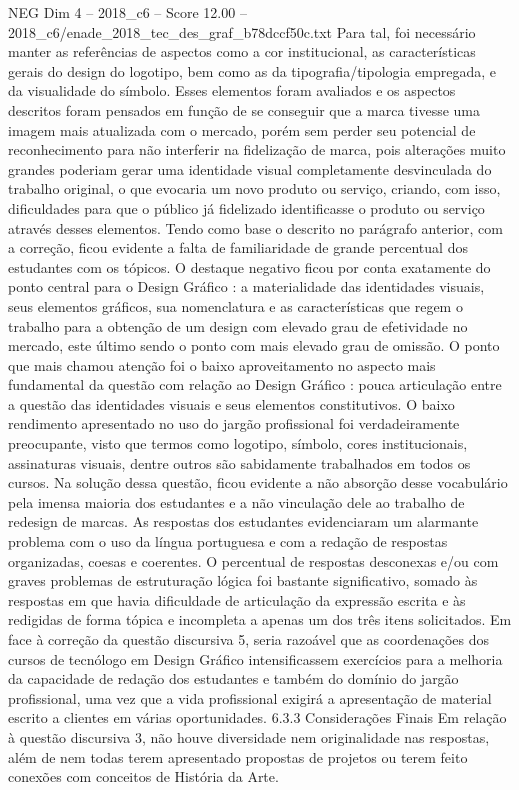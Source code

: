 \begin{textsample}{NEG Dim 4 – 2018\_c6 – Score 12.00 – 2018\_c6/enade\_2018\_tec\_des\_graf\_b78dccf50c.txt}
Para tal, foi necessário manter as referências de aspectos como a cor institucional, as características gerais do design do logotipo, bem como as da tipografia/tipologia empregada, e da visualidade do símbolo.
Esses elementos foram avaliados e os aspectos descritos foram pensados em função de se conseguir que a marca tivesse uma imagem mais atualizada com o mercado, porém sem perder seu potencial de reconhecimento para não interferir na fidelização de marca, pois alterações muito grandes poderiam gerar uma identidade visual completamente desvinculada do trabalho original, o que evocaria um novo produto ou serviço, criando, com isso, dificuldades para que o público já fidelizado identificasse o produto ou serviço através desses elementos.
Tendo como base o descrito no parágrafo anterior, com a correção, ficou evidente a falta de familiaridade de grande percentual dos estudantes com os tópicos.
O destaque negativo ficou por conta exatamente do ponto central para o Design Gráfico : a materialidade das identidades visuais, seus elementos gráficos, sua nomenclatura e as características que regem o trabalho para a obtenção de um design com elevado grau de efetividade no mercado, este último sendo o ponto com mais elevado grau de omissão.
O ponto que mais chamou atenção foi o baixo aproveitamento no aspecto mais fundamental da questão com relação ao Design Gráfico : pouca articulação entre a questão das identidades visuais e seus elementos constitutivos.
O baixo rendimento apresentado no uso do jargão profissional foi verdadeiramente preocupante, visto que termos como logotipo, símbolo, cores institucionais, assinaturas visuais, dentre outros são sabidamente trabalhados em todos os cursos.
Na solução dessa questão, ficou evidente a não absorção desse vocabulário pela imensa maioria dos estudantes e a não vinculação dele ao trabalho de redesign de marcas.
As respostas dos estudantes evidenciaram um alarmante problema com o uso da língua portuguesa e com a redação de respostas organizadas, coesas e coerentes.
O percentual de respostas desconexas e/ou com graves problemas de estruturação lógica foi bastante significativo, somado às respostas em que havia dificuldade de articulação da expressão escrita e às redigidas de forma tópica e incompleta a apenas um dos três itens solicitados.
Em face à correção da questão discursiva 5, seria razoável que as coordenações dos cursos de tecnólogo em Design Gráfico intensificassem exercícios para a melhoria da capacidade de redação dos estudantes e também do domínio do jargão profissional, uma vez que a vida profissional exigirá a apresentação de material escrito a clientes em várias oportunidades. 6.3.3 Considerações Finais Em relação à questão discursiva 3, não houve diversidade nem originalidade nas respostas, além de nem todas terem apresentado propostas de projetos ou terem feito conexões com conceitos de História da Arte.

\end{textsample}
